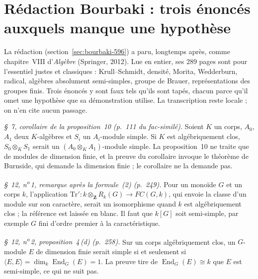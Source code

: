\section[Rédaction Bourbaki \redac{596} : trois hypothèses manquantes]{Rédaction Bourbaki  : trois énoncés auxquels manque une hypothèse\protect{}}\label{sec:bourbaki-596-hypotheses}

La rédaction  (section~\ref{sec:bourbaki-596}) a paru, longtemps après, comme chapitre~VIII d'\emph{Algèbre} (Springer, 2012). Lue en entier, ses 289 pages sont pour l'essentiel justes et classiques : Krull--Schmidt, densité, Morita, Wedderburn, radical, algèbres absolument semi-simples, groupe de Brauer, représentations des groupes finis. Trois énoncés y sont faux tels qu'ils sont tapés, chacun parce qu'il omet une hypothèse que sa démonstration utilise. La transcription reste locale ; on n'en cite aucun passage.

\emph{§~7, corollaire de la proposition~10 (p.~111 du fac-similé).} Soient $K$ un corps, $A_0$, $A_1$ deux $K$-algèbres et $S_i$ un $A_i$-module simple. Si $K$ est algébriquement clos, $S_0 \otimes_K S_1$ serait un $(A_0 \otimes_K A_1)$-module simple. La proposition~10 ne traite que de modules de dimension finie, et la preuve du corollaire invoque le théorème de Burnside, qui demande la dimension finie ; le corollaire ne la demande pas.

\emph{§~12, n\textsuperscript{o}\,1, remarque après la formule~(2) (p.~249).} Pour un monoïde $G$ et un corps $k$, l'application $\mathrm{Tr}' : k \otimes_{\mathbf Z} R_k(G) \to FC(G, k)$, qui envoie la classe d'un module sur son caractère, serait un isomorphisme quand $k$ est algébriquement clos ; la référence est laissée en blanc. Il faut que $k[G]$ soit semi-simple, par exemple $G$ fini d'ordre premier à la caractéristique.

\emph{§~12, n\textsuperscript{o}\,2, proposition~4\,(d) (p.~258).} Sur un corps algébriquement clos, un $G$-module $E$ de dimension finie serait simple si et seulement si $\langle E, E\rangle = \dim_k \operatorname{End}_G(E) = 1$. La preuve tire de $\operatorname{End}_G(E) \cong k$ que $E$ est semi-simple, ce qui ne suit pas.

